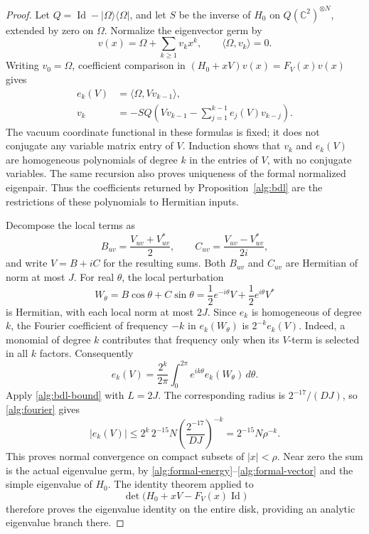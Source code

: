 \documentclass[reqno]{amsart}
\theoremstyle{definition}
\theoremstyle{remark}
\newcommand{\C}{\mathbb C}
\DeclareMathOperator{\Id}{Id}
\begin{document}
\begin{proof}
Let \(Q=\Id-|\Omega\rangle\langle\Omega|\), and let \(S\) be the
inverse of \(H_0\) on \(Q(\C^2)^{\otimes N}\), extended by zero on
\(\Omega\).  Normalize the eigenvector germ by
\[
 v(x)=\Omega+\sum_{k\ge1}v_kx^k,\qquad
 \langle\Omega,v_k\rangle=0.
 \]
Writing \(v_0=\Omega\), coefficient comparison in
\((H_0+xV)v(x)=F_V(x)v(x)\) gives
\begin{align}
 e_k(V)&=\langle\Omega,Vv_{k-1}\rangle,
 \label{alg:formal-energy}\\
 v_k&=-S Q\left(
        Vv_{k-1}-\sum_{j=1}^{k-1}e_j(V)v_{k-j}
       \right).
 \label{alg:formal-vector}
\end{align}
The vacuum coordinate functional in these formulas is fixed; it does
not conjugate any variable matrix entry of \(V\).
Induction shows that \(v_k\) and \(e_k(V)\) are homogeneous
polynomials of degree \(k\) in the entries of \(V\), with no conjugate
variables.  The same recursion also proves uniqueness of the formal
normalized eigenpair.  Thus the coefficients returned by
Proposition~\ref{alg:bdl} are the restrictions of these polynomials
to Hermitian inputs.

Decompose the local terms as
\[
 B_{uv}=\frac{V_{uv}+V_{uv}^*}{2},\qquad
 C_{uv}=\frac{V_{uv}-V_{uv}^*}{2i},
 \]
and write \(V=B+iC\) for the resulting sums.
Both \(B_{uv}\) and \(C_{uv}\) are Hermitian of norm at most \(J\).
For real \(\theta\), the local perturbation
\[
 W_\theta=B\cos\theta+C\sin\theta
 =\frac12 e^{-i\theta}V+\frac12 e^{i\theta}V^*
 \]
is Hermitian, with each local norm at most \(2J\).
Since \(e_k\) is homogeneous of degree \(k\), the Fourier coefficient
of frequency \(-k\) in \(e_k(W_\theta)\) is
\(2^{-k}e_k(V)\).  Indeed, a monomial of degree \(k\) contributes
that frequency only when its \(V\)-term is selected in all \(k\)
factors.  Consequently
\begin{equation}
 e_k(V)=\frac{2^k}{2\pi}
       \int_0^{2\pi} e^{ik\theta}e_k(W_\theta)\,d\theta.
 \label{alg:fourier}
\end{equation}
Apply \eqref{alg:bdl-bound} with \(L=2J\).  The corresponding
radius is \(2^{-17}/(DJ)\), so \eqref{alg:fourier} gives
\[
 |e_k(V)|
 \le 2^k\,2^{-15}N
          \left(\frac{2^{-17}}{DJ}\right)^{-k}
 =2^{-15}N\rho^{-k}.
 \]
This proves normal convergence on compact subsets of \(|x|<\rho\).
Near zero the sum is the actual eigenvalue germ, by
\eqref{alg:formal-energy}--\eqref{alg:formal-vector} and the
simple eigenvalue of \(H_0\).  The identity theorem applied to
\[
 \det\bigl(H_0+xV-F_V(x)\Id\bigr)
 \]
therefore proves the eigenvalue identity on the entire disk,
providing an analytic eigenvalue branch there.


\end{proof}
\end{document}
